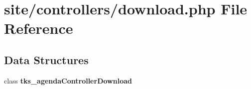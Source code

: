 \section{site/controllers/download.php File Reference}
\label{site_2controllers_2download_8php}
\subsection*{Data Structures}
\begin{DoxyCompactItemize}
\item 
class \textbf{ tks\+\_\+agenda\+Controller\+Download}
\end{DoxyCompactItemize}
